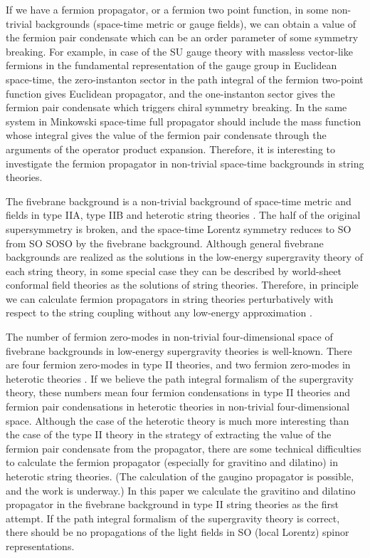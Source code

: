 \documentclass[a4paper,prd,preprint]{revtex4}
\begin{document}
If we have a fermion propagator, or a fermion two point function,
 in some non-trivial backgrounds (space-time metric or gauge fields),
 we can obtain a value of the fermion pair condensate
 which can be an order parameter of some symmetry breaking.
For example,
 in case of the SU\coordHE{} gauge theory
 with massless vector-like fermions
 in the fundamental representation of the gauge group
 in Euclidean space-time,
 the zero-instanton sector in the path integral
 of the fermion two-point function gives Euclidean propagator,
 and the one-instanton sector gives the fermion pair condensate
 which triggers chiral symmetry breaking.
In the same system in Minkowski space-time
 full propagator should include the mass function
 whose integral gives the value of the fermion pair condensate
 through the arguments of the operator product expansion.
Therefore,
 it is interesting to investigate the fermion propagator
 in non-trivial space-time backgrounds
 in string theories.

The fivebrane background
 is a non-trivial background of space-time metric and fields
 in type IIA, type IIB and heterotic string theories
 \cite{Rey1,CHS1,CHS2}.
The half of the original supersymmetry is broken,
 and the space-time Lorentz symmetry reduces to SO\coordHE{}
 from SO\coordHE{} SO\coordHE{}SO\coordHE{}
 by the fivebrane background.
Although
 general fivebrane backgrounds are realized as the solutions
 in the low-energy supergravity theory of each string theory,
 in some special case they can be described
 by world-sheet conformal field theories
 as the solutions of string theories\cite{Rey2,AFK}.
Therefore, in principle
 we can calculate fermion propagators in string theories
 perturbatively with respect to the string coupling
 without any low-energy approximation
 \cite{Fainberg-Marshakov,Marshakov}.

The number of fermion zero-modes
 in non-trivial four-dimensional space of fivebrane backgrounds
 in low-energy supergravity theories
 is well-known\cite{CHS2}.
There are
 four fermion zero-modes in type II theories\cite{Kitazawa1},
 and two fermion zero-modes in heterotic theories
 \cite{Katagiri-Kitazawa}.
If we believe
 the path integral formalism of the supergravity theory,
 these numbers mean
 four fermion condensations in type II theories
 and fermion pair condensations in heterotic theories
 in non-trivial four-dimensional space.
Although
 the case of the heterotic theory
 is much more interesting than the case of the type II theory
 in the strategy of extracting the value of
 the fermion pair condensate from the propagator,
 there are some technical difficulties to calculate
 the fermion propagator (especially for gravitino and dilatino)
 in heterotic string theories.
 (The calculation of the gaugino propagator is possible,
  and the work is underway.) 
In this paper
 we calculate the gravitino and dilatino propagator
 in the fivebrane background in type II string theories
 as the first attempt.
If the path integral formalism of the supergravity theory is correct,
 there should be no propagations of the light fields
 in SO\coordHE{} (local Lorentz) spinor representations.
\end{document}
